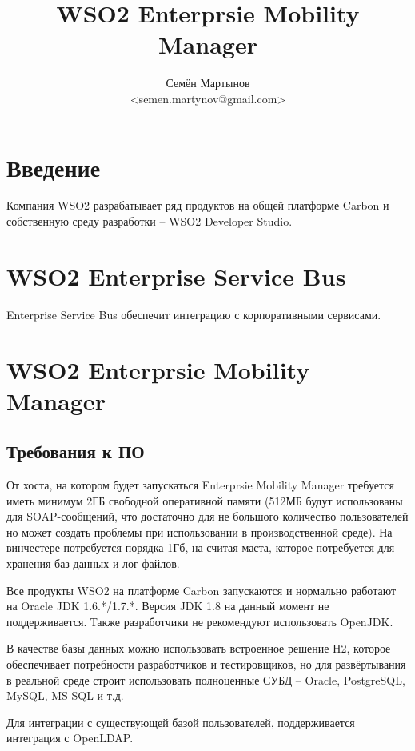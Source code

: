 \documentclass[a4paper, 12pt]{article}		%
\author{Семён Мартынов\\<semen.martynov@gmail.com>}
\title{WSO2 Enterprsie Mobility Manager}
\begin{document}
\maketitle
\tableofcontents{}


\section{Введение}

Компания WSO2 разрабатывает ряд продуктов на общей платформе Carbon и собственную среду разработки -- WSO2 Developer Studio.

\section{WSO2 Enterprise Service Bus}

Enterprise Service Bus обеспечит интеграцию с корпоративными сервисами.

\section{WSO2 Enterprsie Mobility Manager}

\subsection{Требования к ПО}

От хоста, на котором будет запускаться Enterprsie Mobility Manager требуется иметь минимум 2ГБ свободной оперативной памяти (512МБ будут использованы для SOAP-сообщений, что достаточно для не большого количество пользователей но может создать проблемы при использовании в производственной среде). На винчестере потребуется порядка 1Гб, на считая маста, которое потребуется для хранения баз данных и лог-файлов.

Все продукты WSO2 на платформе Carbon запускаются и нормально работают на Oracle JDK 1.6.*/1.7.*. Версия JDK 1.8 на данный момент не поддерживается. Также разработчики не рекомендуют использовать OpenJDK.

В качестве базы данных можно использовать встроенное решение H2, которое обеспечивает потребности разработчиков и тестировщиков, но для развёртывания в реальной среде строит использовать полноценные СУБД -- Oracle, PostgreSQL, MySQL, MS SQL и т.д.

Для интеграции с существующей базой пользователей, поддерживается интеграция с OpenLDAP.
\end{document}
